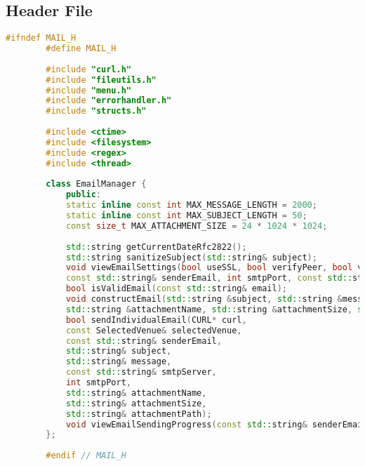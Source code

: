 \documentclass{article}
\begin{document}
	\subsection*{Header File}
	\begin{mdframed}[backgroundcolor=background, hidealllines=false, innerleftmargin=15pt, innerrightmargin=5pt, innertopmargin=0pt, innerbottommargin=-5pt, linecolor=accent]
	\begin{lstlisting}[language=C++]
		#ifndef MAIL_H
		#define MAIL_H
		
		#include "curl.h"
		#include "fileutils.h"
		#include "menu.h"
		#include "errorhandler.h"
		#include "structs.h"
		
		#include <ctime>
		#include <filesystem>
		#include <regex>
		#include <thread>
		
		class EmailManager {
			public:
			static inline const int MAX_MESSAGE_LENGTH = 2000;
			static inline const int MAX_SUBJECT_LENGTH = 50;
			const size_t MAX_ATTACHMENT_SIZE = 24 * 1024 * 1024;
			
			std::string getCurrentDateRfc2822();
			std::string sanitizeSubject(std::string& subject);
			void viewEmailSettings(bool useSSL, bool verifyPeer, bool verifyHost, bool verbose,  
			const std::string& senderEmail, int smtpPort, const std::string& smtpServer);
			bool isValidEmail(const std::string& email);
			void constructEmail(std::string &subject, std::string &message, std::string &attachmentPath, 
			std::string &attachmentName, std::string &attachmentSize, std::istream &in = std::cin);
			bool sendIndividualEmail(CURL* curl,
			const SelectedVenue& selectedVenue,
			const std::string& senderEmail,
			std::string& subject,
			std::string& message,
			const std::string& smtpServer,
			int smtpPort,
			std::string& attachmentName,
			std::string& attachmentSize,
			std::string& attachmentPath);
			void viewEmailSendingProgress(const std::string& senderEmail);
		};
		
		#endif // MAIL_H
	\end{lstlisting}
\end{mdframed}
\end{document}
